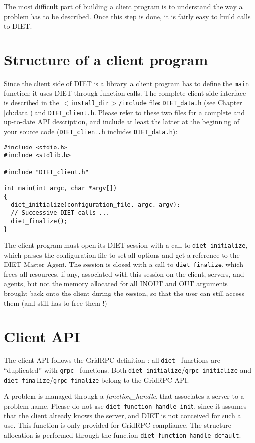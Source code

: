 The most difficult part of building a client program is to understand the way a
problem has to be described. Once this step is done, it is fairly easy to
build calls to DIET.


\section{Structure of a client program}
\label{sec:cl_struct}

Since the client side of DIET is a library, a client program has to define the
\texttt{main} function: it uses DIET through function calls. The complete
client-side interface is described in the \texttt{$<$install\_dir$>$/include}
files \texttt{DIET\_data.h} (see Chapter \ref{ch:data}) and
\texttt{DIET\_client.h}. Please refer to these two files for a complete and
up-to-date API description, and include at least the latter at the beginning of
your source code (\texttt{DIET\_client.h} includes \texttt{DIET\_data.h}):
{\footnotesize
\begin{verbatim}
#include <stdio.h>
#include <stdlib.h>

#include "DIET_client.h"

int main(int argc, char *argv[])
{
  diet_initialize(configuration_file, argc, argv);
  // Successive DIET calls ...
  diet_finalize();
}
\end{verbatim}
}

The client program must open its DIET session with a call to
\texttt{diet\_initialize}, which parses the configuration file to set
all options and get a reference to the DIET Master Agent. The session
is closed with a call to \texttt{diet\_finalize}, which frees all
resources, if any, associated with this session on the client, servers,
and agents, but not the memory allocated for all INOUT and OUT
arguments brought back onto the client during the session, so that the
user can still access them (and still has to free them !)


\section{Client API}
\label{sec:clAPI}

The client API follows the GridRPC definition \cite{gridRPC:02}: all
\texttt{diet\_} functions are ``duplicated'' with \texttt{grpc\_}
functions.  Both \texttt{diet\_initialize}/\texttt{grpc\_initialize}
and \texttt{diet\_finalize}/\texttt{grpc\_finalize} belong to the
GridRPC API. 
 
A problem is managed through a \emph{function\_handle}, that
associates a server to a problem name. Please do not use
\texttt{diet\_function\_handle\_init}, since it assumes that the
client already knows the server, and DIET is not conceived for such a
use. This function is only provided for GridRPC compliance. The
structure allocation is performed through the function
\texttt{diet\_function\_handle\_default}.

